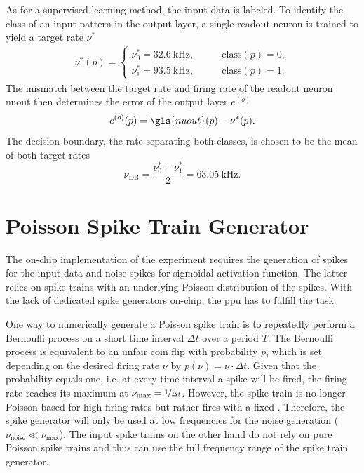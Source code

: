 As for a supervised learning method, the input data is labeled. To identify the class of an input pattern in the output layer, a single readout neuron is trained to yield a target rate $\nu^*$
\begin{align}
\nu^*(p) =
\begin{cases}
\nu_0^* = \SI{32.6}{\kilo \Hz} ,&\quad \quad \text{class}(p) = 0,\\
\nu_1^* = \SI{93.5}{\kilo \Hz} ,&\quad \quad \text{class}(p) = 1.
\end{cases}
\label{circlestarget}
\end{align}
The mismatch between the target rate and firing rate of the readout neuron \gls{nuout} then determines the error of the output layer $e^{(o)}$
\begin{equation*}
e^{(o)}(p) = \gls{nuout}(p) - \nu^*(p).
\label{circleserror}
\end{equation*}
The decision boundary, the rate separating both classes, is chosen to be the mean of both target rates
\begin{equation*}
\nu_\text{DB} = \frac{\nu_0^* + \nu_1^*}{2} = \SI{63.05}{\kilo \Hz}.
\label{circlesdb}
\end{equation*}


\section{Poisson Spike Train Generator}
\label{poissonspiketrains}
The on-chip implementation of the experiment requires the generation of spikes for the input data and noise spikes for sigmoidal activation function. The latter relies on spike trains with an underlying Poisson distribution of the spikes. With the lack of dedicated spike generators on-chip, the \gls{ppu} has to fulfill the task.

One way to numerically generate a Poisson spike train is to repeatedly perform a Bernoulli process on a short time interval $\Delta t$ over a period $T$. The Bernoulli process is equivalent to an unfair coin flip with probability $p$, which is set depending on the desired firing rate $\nu$ by $p(\nu) = \nu \cdot \Delta t$. Given that the probability equals one, i.e. at every time interval a spike will be fired, the firing rate reaches its maximum at $\nu_\text{max} = \nicefrac{1}{\Delta t}$. However, the spike train is no longer Poisson-based for high firing rates but rather fires with a fixed . Therefore, the spike generator will only be used at low frequencies for the noise generation ($\nu_\text{noise} \ll \nu_\text{max}$). The input spike trains on the other hand do not rely on pure Poisson spike trains and thus can use the full frequency range of the spike train generator.

